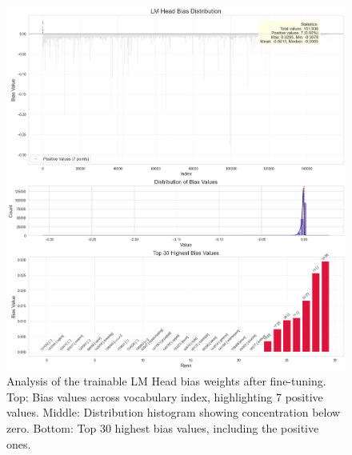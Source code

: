 \documentclass{article}
\begin{document}
\begin{figure}[!htbp]
    \centering
    \includegraphics[width=1\linewidth]{M2 Course Work//Images/bias_analysis.png} %
    \caption{Analysis of the trainable LM Head bias weights after fine-tuning. Top: Bias values across vocabulary index, highlighting 7 positive values. Middle: Distribution histogram showing concentration below zero. Bottom: Top 30 highest bias values, including the positive ones.}
    \label{fig:bias_analysis}
\end{figure}
\end{document}
